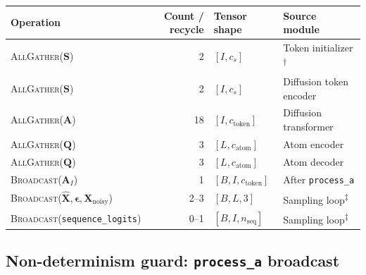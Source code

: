 \documentclass{article}
\theoremstyle{plain}
\theoremstyle{definition}
\theoremstyle{remark}
\begin{document}
\begin{center}
\small
\begin{tabular}{@{}lrll@{}}
\toprule
\textbf{Operation} & \textbf{Count / recycle} & \textbf{Tensor shape} & \textbf{Source module} \\
\midrule
\textsc{AllGather}($\mathbf{S}$)
  & 2 & $[I, c_s]$ & Token initializer\textsuperscript{$\dagger$} \\
\textsc{AllGather}($\mathbf{S}$)
  & 2 & $[I, c_s]$ & Diffusion token encoder \\
\textsc{AllGather}($\mathbf{A}$)
  & 18 & $[I, c_\text{token}]$ & Diffusion transformer \\
\textsc{AllGather}($\mathbf{Q}$)
  & 3 & $[L, c_\text{atom}]$ & Atom encoder \\
\textsc{AllGather}($\mathbf{Q}$)
  & 3 & $[L, c_\text{atom}]$ & Atom decoder \\
\textsc{Broadcast}($\mathbf{A}_I$)
  & 1 & $[B, I, c_\text{token}]$ & After \texttt{process\_a} \\
\textsc{Broadcast}($\hat{\mathbf{X}}, \boldsymbol{\epsilon}, \mathbf{X}_\text{noisy}$)
  & 2--3 & $[B, L, 3]$ & Sampling loop\textsuperscript{$\ddagger$} \\
\textsc{Broadcast}(\texttt{sequence\_logits})
  & 0--1 & $[B, I, n_\text{seq}]$ & Sampling loop\textsuperscript{$\ddagger$} \\
\bottomrule
\end{tabular}
\label{tab:comm-1d}
\end{center}

\subsection{Non-determinism guard: \texttt{process\_a} broadcast}
\label{app:nondet}
\end{document}
